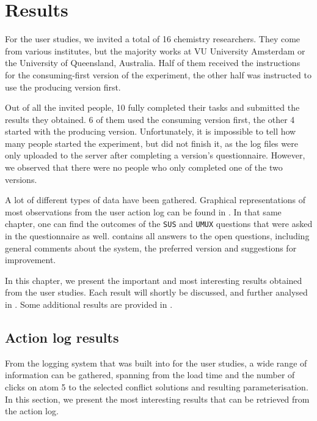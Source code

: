 \chapter{Results}

For the user studies, we invited a total of 16 chemistry researchers. They come from various institutes, but the majority works at VU University Amsterdam or the University of Queensland, Australia. Half of them received the instructions for the consuming-first version of the experiment, the other half was instructed to use the producing version first.

Out of all the invited people, 10 fully completed their tasks and submitted the results they obtained. 6 of them used the consuming version first, the other 4 started with the producing version. Unfortunately, it is impossible to tell how many people started the experiment, but did not finish it, as the log files were only uploaded to the server after completing a version's questionnaire. However, we observed that there were no people who only completed one of the two versions.

A lot of different types of data have been gathered. Graphical representations of most observations from the user action log can be found in . In that same chapter, one can find the outcomes of the \verb|SUS| and \verb|UMUX| questions that were asked in the questionnaire as well.  contains all answers to the open questions, including general comments about the system, the preferred version and suggestions for improvement.

In this chapter, we present the important and most interesting results obtained from the user studies. Each result will shortly be discussed, and further analysed in . Some additional results are provided in .


\section{Action log results}
From the logging system that was built into \oframp{} for the user studies, a wide range of information can be gathered, spanning from the load time and the number of clicks on atom 5 to the selected conflict solutions and resulting parameterisation. In this section, we present the most interesting results that can be retrieved from the action log.

